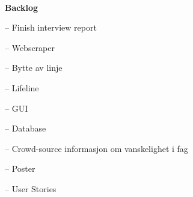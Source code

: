 \documentclass[pdftex, 12pt, norsk, a4paper, twoside]{article}
\numberwithin{equation}{section}
\numberwithin{figure}{section}
\numberwithin{table}{section}
\begin{document}
\makeatletter
\newcommand*{\rom}[1]{\expandafter\@slowromancap\romannumeral #1@}
\makeatother
\hfill\\ %

\begin{center} %
\LARGE{\textbf{Backlog}}
\end{center}

\newenvironment{checklist}{%
  \begin{list}{}{}%
  \let\olditem\item
  \renewcommand\item{\olditem -- \marginpar{$\Box$} }
  \newcommand\checkeditem{\olditem -- \marginpar{$\CheckedBox$} }
}{%
  \end{list}
} 

\begin{checklist}

  \item Finish interview report
  
  \item Webscraper
  
  \item Bytte av linje
  
  \item Lifeline 
  
  \item GUI
  
  \item Database
  
  \item Crowd-source informasjon om vanskelighet i fag
  
  \item Poster
  
  \item User Stories
\end{checklist}
\end{document}
